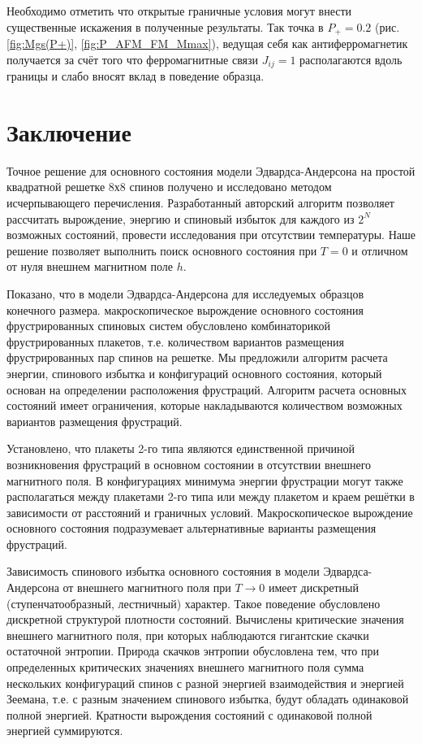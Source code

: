 \documentclass[utf8, babel, sor, jor, amsmath, amssymb, reprint]{elsarticle} %
\begin{document}
Необходимо отметить что открытые граничные условия могут внести существенные искажения в полученные результаты. Так точка в $P_+ = 0.2$ (рис. \ref{fig:Mgs(P+)}, \ref{fig:P_AFM_FM_Mmax}), ведущая себя как антиферромагнетик получается за счёт того что ферромагнитные связи $J_{ij} = 1$ располагаются вдоль границы и слабо вносят вклад в поведение образца.

\section{Заключение}

Точное решение для основного состояния модели Эдвардса-Андерсона на простой квадратной решетке 8х8 спинов получено и исследовано методом исчерпывающего перечисления. Разработанный авторский алгоритм позволяет рассчитать вырождение, энергию и спиновый избыток для каждого из $2^N$ возможных состояний, провести исследования при отсутствии температуры. Наше решение позволяет выполнить поиск основного состояния при $T=0$  и отличном от нуля внешнем магнитном поле $h$. 

Показано, что в модели Эдвардса-Андерсона для исследуемых образцов конечного размера. макроскопическое вырождение основного состояния фрустрированных спиновых систем обусловлено комбинаторикой фрустрированных плакетов, т.е. количеством вариантов размещения фрустрированных пар спинов на решетке. Мы предложили алгоритм расчета энергии, спинового избытка и конфигураций основного состояния, который основан на определении расположения фрустраций. Алгоритм расчета основных состояний имеет ограничения, которые накладываются количеством возможных вариантов размещения фрустраций. 

Установлено, что плакеты 2-го типа являются единственной причиной возникновения фрустраций в основном состоянии в отсутствии внешнего магнитного поля. В конфигурациях  минимума энергии фрустрации могут также располагаться между плакетами 2-го типа или между плакетом и краем решётки в зависимости от расстояний и граничных условий. Макроскопическое вырождение основного состояния подразумевает альтернативные варианты размещения фрустраций.

Зависимость спинового избытка основного состояния в модели Эдвардса-Андерсона от внешнего магнитного поля при $T\rightarrow 0$ имеет дискретный (ступенчатообразный, лестничный) характер. Такое поведение обусловлено дискретной структурой плотности состояний. Вычислены критические значения внешнего магнитного поля, при которых наблюдаются гигантские скачки остаточной энтропии. Природа скачков энтропии обусловлена тем, что при определенных критических значениях внешнего магнитного поля сумма нескольких конфигураций спинов с разной энергией взаимодействия и энергией Зеемана, т.е. с разным значением спинового избытка, будут обладать одинаковой полной энергией. Кратности вырождения состояний с одинаковой полной энергией суммируются.
\end{document}
